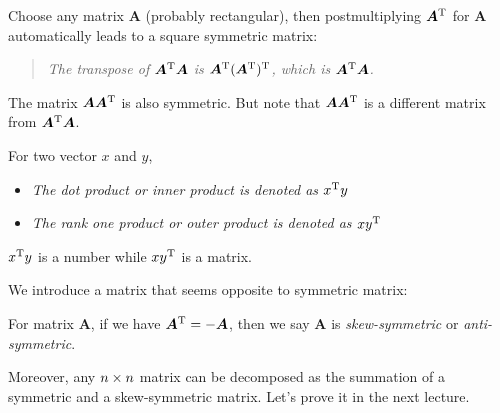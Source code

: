 Choose any matrix $\bm A$ (probably rectangular), then postmultiplying $\bm A^{\mathrm T}$ for $\bm A$ automatically leads to a square symmetric matrix:
\begin{quotation}
\emph{The transpose of $\bm A^{\mathrm T}\bm A$ is $\bm A^{\mathrm T}(\bm A^{\mathrm T})^{\mathrm T}$, which is $\bm A^{\mathrm T}\bm A$.}
\end{quotation}
The matrix $\bm A\bm A^{\mathrm T}$ is also symmetric. But note that $\bm A\bm A^{\mathrm T}$ is a different matrix from $\bm A^{\mathrm T}\bm A$.
\begin{remark}
For two vector $x$ and $y$,
\begin{itemize}
\item
\emph{The dot product or inner product is denoted as $x^{\mathrm T} y$}
\item
\emph{The rank one product or outer product is denoted as $xy^{\mathrm T}$}
\end{itemize}
$x^{\mathrm T} y$ is a number while $xy^{\mathrm T}$ is a matrix.
\end{remark}
We introduce a matrix that seems opposite to symmetric matrix:
\begin{definition}
For matrix $\bm A$, if we have $\bm A^{\mathrm T} = -\bm A$, then we say $\bm A$ is \emph{skew-symmetric} or \emph{anti-symmetric}.
\end{definition}
Moreover, any $n\times n$ matrix can be decomposed as the summation of a symmetric and a skew-symmetric matrix. Let's prove it in the next lecture.




